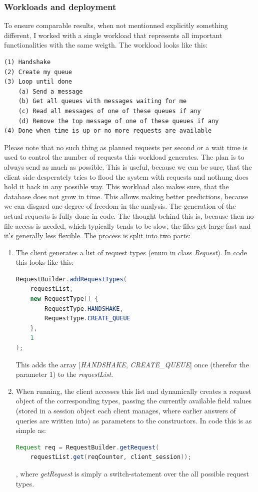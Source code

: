 \documentclass[11pt]{article}
\begin{document}
\subsubsection{Workloads and deployment}\label{sec:workloads-and-deployment}
To ensure comparable results, when not mentionned explicitly something different, I worked with a single workload that represents all important functionalities with the same weigth. The workload looks like this:
\begin{lstlisting}[basicstyle=\small,caption={Main work load},label=lst:load]
(1) Handshake
(2) Create my queue
(3) Loop until done
    (a) Send a message
    (b) Get all queues with messages waiting for me
    (c) Read all messages of one of these queues if any
    (d) Remove the top message of one of these queues if any
(4) Done when time is up or no more requests are available
\end{lstlisting}
Please note that no such thing as planned requests per second or a wait time is used to control the number of requests this workload generates. The plan is to always send as much as possible. This is useful, because we can be sure, that the client side desperately tries to flood the system with requests and nothung does hold it back in any possible way. This workload also makes sure, that the database does not grow in time. This allows making better predictions, because we can disgard one degree of freedom in the analysis. The generation of the actual requests is fully done in code. The thought behind this is, because then no file access is needed, which typically tends to be slow, the files get large fast and it's generally less flexible. The process is split into two parts:
\begin{enumerate}
	\item The client generates a list of request types (enum in class \textit{Request}). In code this looks like this:
\begin{lstlisting}[basicstyle=\small, language=Java]
RequestBuilder.addRequestTypes(
    requestList,
    new RequestType[] {
        RequestType.HANDSHAKE,
        RequestType.CREATE_QUEUE
    },
    1
);
\end{lstlisting}
This adds the array [\textit{HANDSHAKE}, \textit{CREATE\_QUEUE}] once (therefor the parameter 1) to the \textit{requestList}.
	\item When running, the client accesses this list and dynamically creates a request object of the corresponding types, passing the currently available field values (stored in a session object each client manages, where earlier answers of queries are written into) as parameters to the constructors. In code this is as simple as:
\begin{lstlisting}[basicstyle=\small, language=Java]
Request req = RequestBuilder.getRequest(
    requestList.get(reqCounter, client_session));
\end{lstlisting}, where \textit{getRequest} is simply a switch-statement over the all possible request types.
\end{enumerate}
\end{document}
